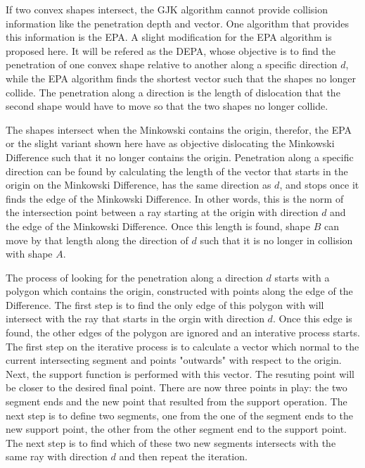 \par If two convex shapes intersect, the \ac{GJK} algorithm cannot provide collision information like the penetration depth and vector. One algorithm that provides this information is the \ac{EPA}.
A slight modification for the \ac{EPA} algorithm is proposed here. It will be refered as the \ac{DEPA}, whose objective is to find the penetration of one convex shape relative to another along a specific direction $d$, while the \ac{EPA} algorithm finds the shortest vector such that the shapes no longer collide. The penetration along a direction is the length of dislocation that the second shape would have to move so that the two shapes no longer collide. 
\par The shapes intersect when the Minkowski contains the origin, therefor, the \ac{EPA} or the slight variant shown here have as objective dislocating the Minkowski Difference such that it no longer contains the origin. Penetration along a specific direction can be found by calculating the length of the vector that starts in the origin on the Minkowski Difference, has the same direction as $d$, and stops once it finds the edge of the Minkowski Difference. In other words, this is the norm of the intersection point between a ray starting at the origin with direction $d$ and the edge of the Minkowski Difference. Once this length is found, shape $B$ can move by that length along the direction of $d$ such that it is no longer in collision with shape $A$.
\par The process of looking for the penetration along a direction $d$ starts with a polygon which contains the origin, constructed with points along the edge of the Difference. The first step is to find the only edge of this polygon with will intersect with the ray that starts in the orgin with direction $d$. Once this edge is found, the other edges of the polygon are ignored and an interative process starts. The first step on the iterative process is to calculate a vector which normal to the current intersecting segment and points "outwards" with respect to the origin. Next, the support function is performed with this vector. The resuting point will be closer to the desired final point. There are now three points in play: the two segment ends and the new point that resulted from the support operation. The next step is to define two segments, one from the one of the segment ends to the new support point, the other from the other segment end to the support point. The next step is to find which of these two new segments intersects with the same ray with direction $d$ and then repeat the iteration. 


